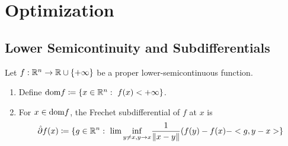 \section{Optimization}
\label{sec:optimization}
\subsection{Lower Semicontinuity and Subdifferentials}
Let $f: \mathbb{R}^n \to \mathbb{R} \cup \{+\infty\}$ be a proper lower-semicontinuous function.
\begin{enumerate}
    \item Define $\dom f\coloneqq \{x\in \R^n: \ f(x)<+\infty\}$.
    \item For $x\in \text{dom} f$, the Frechet subdifferential of $f$ at $x$ is 
    \[ \hat{\partial} f(x) \coloneqq \{g \in \mathbb{R}^n:\ \lim \underset{y\ne x, y\to x}{\inf} \frac{1}{\|x-y\| } (f(y) - f(x) - < g, y-x> \}   \]
\end{enumerate}
